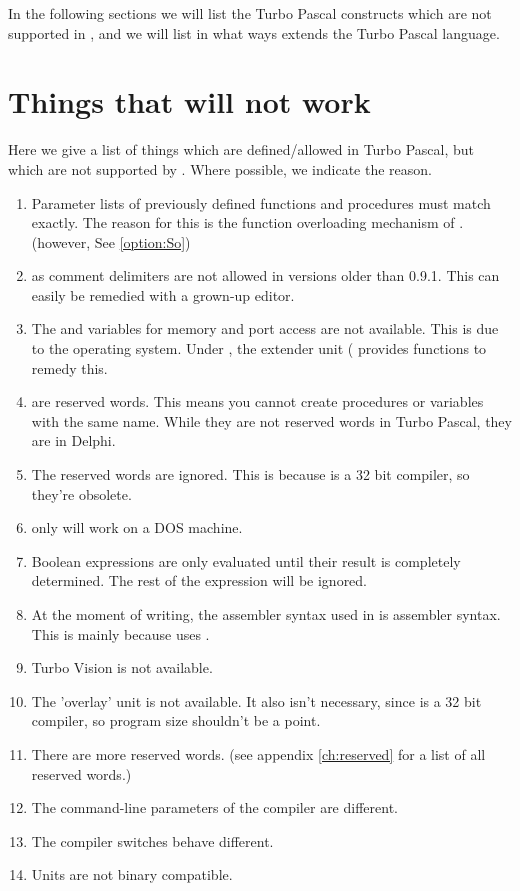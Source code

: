 \documentclass{report}
\newcommand{\seeo}[1]{See \ref{option:#1}}
\begin{document}
In the following sections we will list the Turbo Pascal constructs which are
not supported in \fpc, and we will list in what ways \fpc extends the Turbo
Pascal language.


\section{Things that will not work}
Here we give a list of things which are defined/allowed in Turbo Pascal, but
which are not supported by \fpc. Where possible, we indicate the reason. 
\begin{enumerate}
\item Parameter lists of previously defined functions and procedures must
match exactly. The reason for this is the function overloading mechanism of
\fpc. (however, \seeo{So})
\item {} as comment delimiters are not allowed in versions
older than 0.9.1. This can easily be remedied with a grown-up editor. 
\item The  and  variables for memory and port
access are not available. This is due to the operating system. Under
\dos, the extender unit ( provides functions to remedy this.
\item {} are reserved words.
This means you cannot create procedures or variables with the same name.
While they are not reserved words in Turbo Pascal, they are in Delphi.
\item The reserved words  are ignored. This is
because \fpc is a 32 bit compiler, so they're obsolete.
\item {} only will work on a DOS machine.
\item Boolean expressions are only evaluated until their result is completely
determined. The rest of the expression will be ignored.
\item At the moment of writing, the assembler syntax used in \fpc is 
assembler syntax. This is mainly because \fpc uses \gnu {}.
\item Turbo Vision is not available.
\item The 'overlay' unit is not available. It also isn't necessary, since
\fpc is a 32 bit compiler, so program size shouldn't be a point.
\item There are more reserved words. (see appendix \ref{ch:reserved} for a
list of all reserved words.)
\item The command-line parameters of the compiler are different.
\item The compiler switches behave different.
\item Units are not binary compatible.
\end{enumerate}
\end{document}
